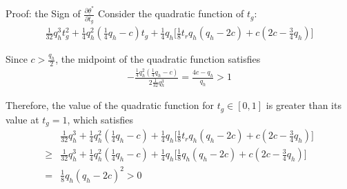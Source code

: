 \documentclass[9pt,aspectratio=1610]{beamer}
\begin{document}
\begin{frame}{Proof: the Sign of $\frac{\partial\underline{\theta}^*}{\partial t_g}$}\label{proof_partial_tg}
Consider the quadratic function of $t_g$:
\begin{align*}
    \frac{1}{32}q_h^3t_g^2 + \frac{1}{4}q_h^2(\frac{1}{4}q_h-c)t_g + \frac{1}{4}q_h\big[\frac{1}{8}t_rq_h(q_h-2c) + c(2c-\frac{3}{4}q_h)\big]
\end{align*}

Since $c>\frac{q_h}{2}$, the midpoint of the quadratic function satisfies
\begin{align*}
    -\frac{\frac{1}{4}q_h^2(\frac{1}{4}q_h-c)}{2\frac{1}{32}q_h^3} = \frac{4c-q_h}{q_h}>1
\end{align*}

Therefore, the value of the quadratic function for $t_g\in[0,1]$ is greater than its value at $t_g=1$, which satisfies
\begin{align*}
    &\frac{1}{32}q_h^3 + \frac{1}{4}q_h^2(\frac{1}{4}q_h-c) + \frac{1}{4}q_h\big[\frac{1}{8}t_rq_h(q_h-2c) + c(2c-\frac{3}{4}q_h)\big]\\
    \geq &\frac{1}{32}q_h^3 + \frac{1}{4}q_h^2(\frac{1}{4}q_h-c) + \frac{1}{4}q_h\big[\frac{1}{8}q_h(q_h-2c) + c(2c-\frac{3}{4}q_h)\big]\\
    =&\frac{1}{8}q_h(q_h-2c)^2>0
\end{align*}


\vspace{1em}
\hyperlink{partial_tg}{}
\end{frame}
\end{document}
